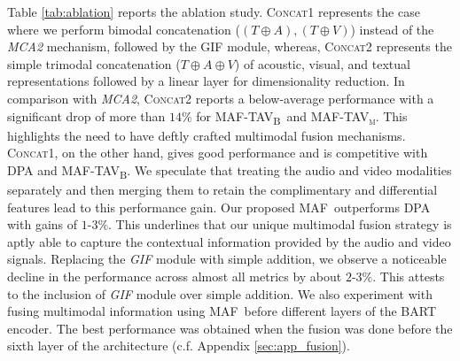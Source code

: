 \documentclass[11pt]{article}
\newcommand{\model}{\textsc{MAF}}
\newcommand{\modelTAV}{\textsc{MAF-TAV\textsubscript{B}}}
\newcommand{\modelTAVm}{\textsc{MAF-TAV\textsubscript{m}}}
\begin{document}
Table \ref{tab:ablation} reports the ablation study. \textsc{Concat1} represents the case where we perform bimodal concatenation ($(T\oplus A), (T\oplus V)$) instead of the \textit{MCA2} mechanism, followed by the GIF module, whereas, \textsc{Concat2} represents the simple trimodal concatenation ($T\oplus A \oplus V$) of acoustic, visual, and textual representations followed by a linear layer for dimensionality reduction. In comparison with \textit{MCA2}, \textsc{Concat2} reports a below-average performance with a significant drop of more than $14\%$ for \modelTAV\ and \modelTAVm. This highlights the need to have deftly crafted multimodal fusion mechanisms. \textsc{Concat1}, on the other hand, gives good performance and is competitive with \textsc{DPA} and \modelTAV. We speculate that treating the audio and video modalities separately and then merging them to retain the complimentary and differential features lead to this performance gain. Our proposed \model\ outperforms \textsc{DPA} with gains of $1$-$3\%$. This underlines that our unique multimodal fusion strategy is aptly able to capture the contextual information provided by the audio and video signals. Replacing the \textit{GIF} module with simple addition, we observe a noticeable decline in the performance across almost all metrics by about $2$-$3\%$. This attests to the inclusion of \textit{GIF} module over simple addition.
We also experiment with fusing multimodal information using \model\ before different layers of the BART encoder. The best performance was obtained when the fusion was done before the sixth layer of the architecture (c.f. Appendix \ref{sec:app_fusion}).
\end{document}
